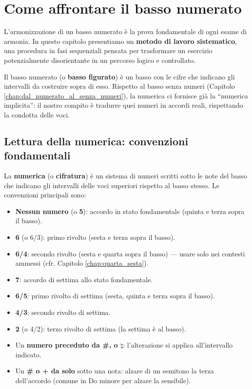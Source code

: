 \chapter{Come affrontare il basso numerato}
\label{chap:metodo_lavoro}

L'armonizzazione di un basso numerato è la prova fondamentale di ogni esame di armonia. In questo capitolo presentiamo un \textbf{metodo di lavoro sistematico}, una procedura in fasi sequenziali pensata per trasformare un esercizio potenzialmente disorientante in un percorso logico e controllato.

Il basso numerato (o \textbf{basso figurato}) è un basso con le cifre che indicano gli intervalli da costruire sopra di esso. Rispetto al basso senza numeri (Capitolo \ref{chap:dal_numerato_al_senza_numeri}), la numerica ci fornisce già la ``numerica implicita'': il nostro compito è tradurre quei numeri in accordi reali, rispettando la condotta delle voci.

\section{Lettura della numerica: convenzioni fondamentali}
\label{sec:lettura_numerica}

\begin{definizione}
	\label{def:numerica}
	La \textbf{numerica} (o \textbf{cifratura}) è un sistema di numeri scritti sotto le note del basso che indicano gli intervalli delle voci superiori rispetto al basso stesso. Le convenzioni principali sono:
	\begin{itemize}
		\item \textbf{Nessun numero} (o \textbf{5}): accordo in stato fondamentale (quinta e terza sopra il basso).
		\item \textbf{6} (o 6/3): primo rivolto (sesta e terza sopra il basso).
		\item \textbf{6/4}: secondo rivolto (sesta e quarta sopra il basso) --- usare solo nei contesti ammessi (cfr. Capitolo \ref{chap:quarta_sesta}).
		\item \textbf{7}: accordo di settima allo stato fondamentale.
		\item \textbf{6/5}: primo rivolto di settima (sesta, quinta e terza sopra il basso).
		\item \textbf{4/3}: secondo rivolto di settima.
		\item \textbf{2} (o 4/2): terzo rivolto di settima (la settima è al basso).
		\item Un \textbf{numero preceduto da \#, \flat{} o $\natural$}: l'alterazione si applica all'intervallo indicato.
		\item Un \textbf{\# o + da solo} sotto una nota: alzare di un semitono la terza dell'accordo (comune in Do minore per alzare la sensibile).
	\end{itemize}
\end{definizione}

